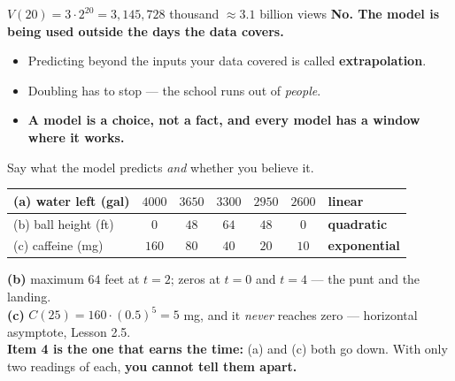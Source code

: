 \documentclass[aspectratio=169, 11pt]{beamer}
\begin{document}
\begin{frame}[t, plain]
  \begin{block}{$V(20) = 3 \cdot 2^{20} = 3{,}145{,}728$ thousand $\approx 3.1$ billion views}
    \centering\large
    \textbf{No. The model is being used outside the days the data covers.}
  \end{block}
  \begin{itemize}
    \setlength{\itemsep}{0.28cm}
    \item Predicting beyond the inputs your data covered is called \textbf{extrapolation}.
    \item Doubling has to stop --- the school runs out of \emph{people}.
    \item \textbf{A model is a choice, not a fact, and every model has a window where it works.}
  \end{itemize}
  \vspace{0.15cm}
  Say what the model predicts \emph{and} whether you believe it.
\end{frame}

\begin{frame}[t, plain]
  \renewcommand{\arraystretch}{1.3}
  \small
  \begin{center}
  \begin{tabular}{@{}|l|c|c|c|c|c||l|@{}}
  \hline
  (a) water left (gal) & $4000$ & $3650$ & $3300$ & $2950$ & $2600$ & \textbf{linear} \\ \hline
  (b) ball height (ft) & $0$ & $48$ & $64$ & $48$ & $0$ & \textbf{quadratic} \\ \hline
  (c) caffeine (mg) & $160$ & $80$ & $40$ & $20$ & $10$ & \textbf{exponential} \\
  \hline
  \end{tabular}
  \end{center}
  \vspace{0.3cm}
  \textbf{(b)} maximum $64$ feet at $t=2$; zeros at $t=0$ and $t=4$ --- the punt and the landing.\\[0.1cm]
  \textbf{(c)} $C(25) = 160 \cdot (0.5)^5 = 5$ mg, and it \emph{never} reaches zero --- horizontal
  asymptote, Lesson 2.5.\\[0.1cm]
  \textbf{Item 4 is the one that earns the time:} (a) and (c) both go down. With only two readings of
  each, \textbf{you cannot tell them apart.}
\end{frame}
\end{document}
